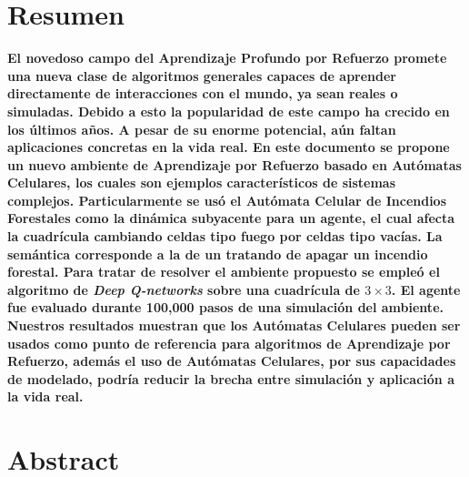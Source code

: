 \documentclass[
  12pt,
  openany]{book}
\author{}
\date{\vspace{-2.5em}}
\newenvironment{preliminary}%
{\pagestyle{empty}\pagenumbering{roman}}%
{\pagenumbering{arabic}}
\begin{document}
\begin{preliminary}







\end{preliminary}

\hypertarget{resumen}{%
\chapter*{Resumen}\label{resumen}}

\textbf{\large{El novedoso campo del Aprendizaje Profundo por Refuerzo promete una nueva clase de algoritmos generales capaces de aprender directamente de interacciones con el mundo, ya sean reales o simuladas. Debido a esto la popularidad de este campo ha crecido en los últimos años. A pesar de su enorme potencial, aún faltan aplicaciones concretas en la vida real. En este documento se propone un nuevo ambiente de Aprendizaje por Refuerzo basado en Autómatas Celulares, los cuales son ejemplos característicos de sistemas complejos. Particularmente se usó el Autómata Celular de Incendios Forestales como la dinámica subyacente para un agente, el cual afecta la cuadrícula cambiando celdas tipo fuego por celdas tipo vacías. La semántica corresponde a la de un  tratando de apagar un incendio forestal. Para tratar de resolver el ambiente propuesto se empleó el algoritmo de \emph{Deep Q-networks} sobre una cuadrícula de $3 \times 3$. El agente fue evaluado durante 100,000 pasos de una simulación del ambiente. Nuestros resultados muestran que los Autómatas Celulares pueden ser usados como punto de referencia para algoritmos de Aprendizaje por Refuerzo, además el uso de Autómatas Celulares, por sus capacidades de modelado, podría reducir la brecha entre simulación y aplicación a la vida real.}}

\hypertarget{abstract}{%
\chapter*{Abstract}\label{abstract}}
\end{document}
